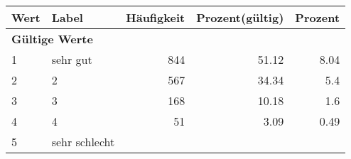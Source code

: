      \begin{longtable}{lXrrr}
     \toprule
     \textbf{Wert} & \textbf{Label} & \textbf{Häufigkeit} & \textbf{Prozent(gültig)} & \textbf{Prozent} \\
     \endhead
     \midrule
     \multicolumn{5}{l}{\textbf{Gültige Werte}}\\

     1 &
     \multicolumn{1}{X}{ sehr gut   } &


       \num{844} &
       \num[round-mode=places,round-precision=2]{51,12} &
         \num[round-mode=places,round-precision=2]{8,04} \\

     2 &
     \multicolumn{1}{X}{ 2   } &


       \num{567} &
       \num[round-mode=places,round-precision=2]{34,34} &
         \num[round-mode=places,round-precision=2]{5,4} \\

     3 &
     \multicolumn{1}{X}{ 3   } &


       \num{168} &
       \num[round-mode=places,round-precision=2]{10,18} &
         \num[round-mode=places,round-precision=2]{1,6} \\

     4 &
     \multicolumn{1}{X}{ 4   } &


       \num{51} &
       \num[round-mode=places,round-precision=2]{3,09} &
         \num[round-mode=places,round-precision=2]{0,49} \\

     5 &
     \multicolumn{1}{X}{ sehr schlecht   } &



\end{longtable}
